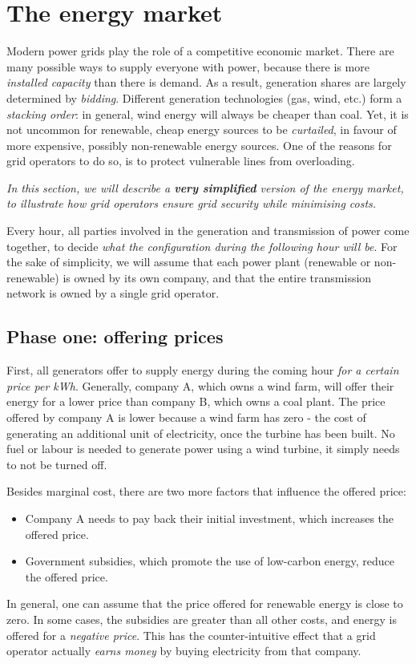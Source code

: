\documentclass[main.tex]{subfiles}
\begin{document}
\section{The energy market}\label{sec:energymarket}
Modern power grids play the role of a competitive economic market. There are many possible ways to supply everyone with power, because there is more \emph{installed capacity} than there is demand. As a result, generation shares are largely determined by \emph{bidding}. Different generation technologies (gas, wind, etc.) form a \emph{stacking order}: in general, wind energy will always be cheaper than coal. Yet, it is not uncommon for renewable, cheap energy sources to be \emph{curtailed}, in favour of more expensive, possibly non-renewable energy sources. One of the reasons for grid operators to do so, is to protect vulnerable lines from overloading. 

\emph{In this section, we will describe a \textbf{very simplified} version of the energy market, to illustrate how grid operators ensure \emph{grid security} while minimising costs.}

Every hour, all parties involved in the generation and transmission of power come together, to decide \emph{what the configuration during the following hour will be}. For the sake of simplicity, we will assume that each power plant (renewable or non-renewable) is owned by its own company, and that the entire transmission network is owned by a single grid operator.

\subsection*{Phase one: offering prices}
First, all generators offer to supply energy during the coming hour \emph{for a certain price per kWh}. Generally, company A, which owns a wind farm, will offer their energy for a lower price than company B, which owns a coal plant. The price offered by company A is lower because a wind farm has zero  - the cost of generating an additional unit of electricity, once the turbine has been built. No fuel or labour is needed to generate power using a wind turbine, it simply needs to not be turned off.

Besides marginal cost, there are two more factors that influence the offered price:
\begin{itemize}[itemsep=0em]
    \item Company A needs to pay back their initial investment, which increases the offered price.
    \item Government subsidies, which promote the use of low-carbon energy, reduce the offered price.
\end{itemize}
In general, one can assume that the price offered for renewable energy is close to zero. In some cases, the subsidies are greater than all other costs, and energy is offered for a \emph{negative price}. This has the counter-intuitive effect that a grid operator actually \emph{earns money} by buying electricity from that company.
\end{document}
